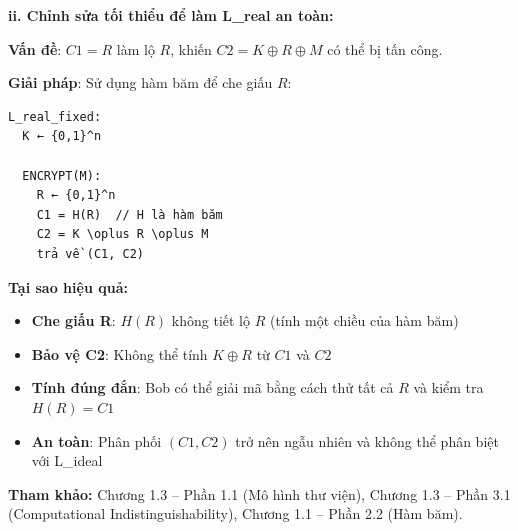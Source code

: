 \textbf{ii. Chỉnh sửa tối thiểu để làm L\_real an toàn:}

\textbf{Vấn đề}: $C1 = R$ làm lộ $R$, khiến $C2 = K \oplus R \oplus M$ có thể bị tấn công.

\textbf{Giải pháp}: Sử dụng hàm băm để che giấu $R$:
\begin{verbatim}
L_real_fixed:
  K ← {0,1}^n
  
  ENCRYPT(M):
    R ← {0,1}^n
    C1 = H(R)  // H là hàm băm
    C2 = K \oplus R \oplus M
    trả về (C1, C2)
\end{verbatim}

\textbf{Tại sao hiệu quả:}
\begin{itemize}
    \item \textbf{Che giấu R}: $H(R)$ không tiết lộ $R$ (tính một chiều của hàm băm)
    \item \textbf{Bảo vệ C2}: Không thể tính $K \oplus R$ từ $C1$ và $C2$
    \item \textbf{Tính đúng đắn}: Bob có thể giải mã bằng cách thử tất cả $R$ và kiểm tra $H(R) = C1$
    \item \textbf{An toàn}: Phân phối $(C1, C2)$ trở nên ngẫu nhiên và không thể phân biệt với L\_ideal
\end{itemize}

\textbf{Tham khảo:} Chương 1.3 – Phần 1.1 (Mô hình thư viện), Chương 1.3 – Phần 3.1 (Computational Indistinguishability), Chương 1.1 – Phần 2.2 (Hàm băm).